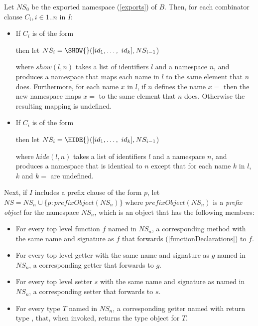 \documentclass{article}
\begin{document}
\LMHash{}
Let $NS_0$ be the exported namespace (\ref{exports}) of $B$.
Then, for each combinator clause $C_i, i \in 1 .. n$ in $I$:
\begin{itemize}
\item If $C_i$ is of the form


then let $NS_i = \SHOW{}([id_1, \ldots,\ id_k], NS_{i-1}$)

where $show(l,n)$ takes a list of identifiers $l$ and a namespace $n$, and produces a namespace that maps each name in $l$ to the same element that $n$ does.
Furthermore, for each name $x$ in $l$, if $n$ defines the name $x=$ then the new namespace maps $x=$ to the same element that $n$ does.
Otherwise the resulting mapping is undefined.

\item If $C_i$ is of the form


then let $NS_i = \HIDE{}([id_1, \ldots,\ id_k], NS_{i-1}$)

where $hide(l, n)$ takes a list of identifiers $l$ and a namespace $n$, and produces a namespace that is identical to $n$ except that for each name $k$ in $l$, $k$ and $k=$ are undefined.
\end{itemize}

\LMHash{}
Next, if $I$ includes a prefix clause of the form \AS{} $p$, let $NS = NS_n \cup \{p: prefixObject(NS_n)\}$ where $prefixObject(NS_n)$ is a {\em prefix object} for the namespace $NS_n$, which is an object that has the following members:

\begin{itemize}
\item For every top level function $f$ named \id{} in $NS_n$, a corresponding method with the same name and signature as $f$ that forwards (\ref{functionDeclarations}) to $f$.
\item For every top level getter with the same name and signature as $g$ named \id{} in $NS_n$, a corresponding getter that forwards to $g$.
\item For every top level setter $s$ with the same name and signature as named \id{} in $NS_n$, a corresponding setter that forwards to $s$.
\item For every type $T$ named \id{} in $NS_n$, a corresponding getter named \id{} with return type , that, when invoked, returns the type object for $T$.
\end{itemize}
\end{document}
